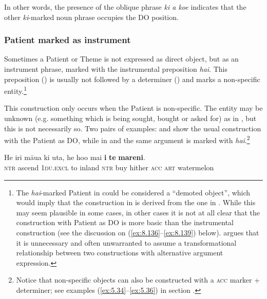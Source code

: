 In other words, the presence of the oblique phrase \textit{ki a koe} indicates that the other \textit{ki}{}-marked noun phrase occupies the DO position.
\subsubsection[Patient marked as instrument]{Patient marked as instrument}\label{sec:8.6.4.3}
Sometimes a Patient or Theme is not expressed as direct object, but as an instrument phrase, marked with the instrumental preposition \textit{hai}. This preposition () is usually not followed by a determiner () and marks a non-specific entity.\footnote{\label{fn:438}The \textit{hai}{}-marked Patient in  could be considered a “demoted object”, which would imply that the construction in  is derived from the one in . While this may seem plausible in some cases, in other cases it is not at all clear that the construction with Patient as DO is more basic than the instrumental construction (see the discussion on (\ref{ex:8.136}–\ref{ex:8.139}) below). \citet{Goldberg1995} argues that it is unnecessary and often unwarranted to assume a transformational relationship between two constructions with alternative argument expression.} 

This construction only occurs when the Patient is non-specific. The entity may be unknown (e.g. something which is being sought, bought or asked for) as in , but this is not necessarily so. Two pairs of examples:  and  show the usual construction with the Patient as DO, while in  and  the same argument is marked with \textit{hai}.\footnote{\label{fn:439}Notice that non-specific objects can also be constructed with a \textsc{acc} marker + determiner; see examples (\ref{ex:5.34}–\ref{ex:5.36}) in section .}

\ea\label{ex:8.130}
\gll He iri māua ki {\ꞌ}uta, he ho{\ꞌ}o mai \textbf{i} \textbf{te} \textbf{mareni}. \\
\textsc{ntr} ascend \textsc{1du.excl} to inland \textsc{ntr} buy hither \textsc{acc} \textsc{art} watermelon \\

